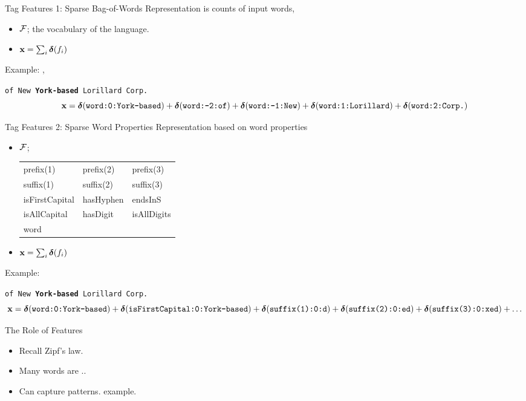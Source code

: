 \documentclass{beamer}
\begin{document}
\begin{frame}{Tag Features 1: Sparse Bag-of-Words }
  Representation is counts of input words, 
  \begin{itemize}
  \item $\mathcal{F}$; the vocabulary of the language.
  \item $\mathbf{x} = \sum_{i} \boldsymbol{\delta}(f_i)$ 
  \end{itemize}

  Example: , 
  \begin{center}
    \texttt{of New \textbf{York-based} Lorillard Corp.}
    \[ \mathbf{x} = \boldsymbol{\delta}(\texttt{word:0:York-based})  + 
    \boldsymbol{\delta}(\texttt{word:-2:of}) + \boldsymbol{\delta}(\texttt{word:-1:New})  + 
    \boldsymbol{\delta}(\texttt{word:1:Lorillard}) + \boldsymbol{\delta}(\texttt{word:2:Corp.}) 
    \] 
  \end{center}

\end{frame}


\begin{frame}{Tag Features 2: Sparse Word Properties }
  Representation based on word properties
  \begin{itemize}
  \item $\mathcal{F}$; 

    \begin{tabular}{lll}
      prefix(1)  & prefix(2) & prefix(3)\\  
      suffix(1)  & suffix(2) & suffix(3) \\  
      isFirstCapital & hasHyphen & endsInS \\
      isAllCapital & hasDigit & isAllDigits \\
      word \\
    \end{tabular}

  \item $\mathbf{x} = \sum_{i} \boldsymbol{\delta}(f_i)$ 
  \end{itemize}

  Example:  
  \begin{center}
    \texttt{of New \textbf{York-based} Lorillard Corp.}
    \[ \mathbf{x} = \boldsymbol{\delta}(\texttt{word:0:York-based})  + 
    \boldsymbol{\delta}(\texttt{isFirstCapital:0:York-based}) + 
    \boldsymbol{\delta}(\texttt{suffix(1):0:d}) + 
    \boldsymbol{\delta}(\texttt{suffix(2):0:ed}) + 
    \boldsymbol{\delta}(\texttt{suffix(3):0:xed}) + \ldots\] 
  \end{center}
\end{frame}

\begin{frame}{The Role of Features}
  \begin{itemize}
  \item Recall Zipf's law. 
  \item Many words are .. 
  \item Can capture patterns. 
    example.
  \end{itemize}
\end{frame}
\end{document}
